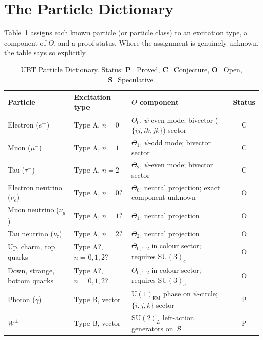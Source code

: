 \documentclass[12pt,a4paper]{article}
\theoremstyle{remark}
\newcommand{\B}{\mathcal{B}}
\begin{document}
\section{The Particle Dictionary}
\label{sec:dict}

Table~\ref{tab:dict} assigns each known particle (or particle class) to an
excitation type, a component of $\Theta$, and a proof status.  Where the
assignment is genuinely unknown, the table says so explicitly.

\begin{table}[htbp]
\centering
\caption{UBT Particle Dictionary. Status: \textbf{P}=Proved,
  \textbf{C}=Conjecture, \textbf{O}=Open, \textbf{S}=Speculative.}
\label{tab:dict}
\renewcommand{\arraystretch}{1.35}
\begin{tabular}{>{\raggedright}p{3.2cm}
                >{\raggedright}p{2.8cm}
                >{\raggedright}p{4.8cm}
                c}
\toprule
\textbf{Particle} & \textbf{Excitation type} & \textbf{$\Theta$ component} & \textbf{Status} \\
\midrule
Electron ($e^-$)
  & Type A, $n=0$
  & $\Theta_0$, $\psi$-even mode; bivector ($\{ij,ik,jk\}$) sector
  & C \\
Muon ($\mu^-$)
  & Type A, $n=1$
  & $\Theta_1$, $\psi$-odd mode; bivector sector
  & C \\
Tau ($\tau^-$)
  & Type A, $n=2$
  & $\Theta_2$, $\psi$-even mode; bivector sector
  & C \\
Electron neutrino ($\nu_e$)
  & Type A, $n=0$?
  & $\Theta_0$, neutral projection; exact component unknown
  & O \\
Muon neutrino ($\nu_\mu$)
  & Type A, $n=1$?
  & $\Theta_1$, neutral projection
  & O \\
Tau neutrino ($\nu_\tau$)
  & Type A, $n=2$?
  & $\Theta_2$, neutral projection
  & O \\
Up, charm, top quarks
  & Type A?, $n=0,1,2$?
  & $\Theta_{0,1,2}$ in colour sector; requires SU$(3)_c$
  & O \\
Down, strange, bottom quarks
  & Type A?, $n=0,1,2$?
  & $\Theta_{0,1,2}$ in colour sector; requires SU$(3)_c$
  & O \\
Photon ($\gamma$)
  & Type B, vector
  & U$(1)_{\mathrm{EM}}$ phase on $\psi$-circle; $\{i,j,k\}$ sector
  & P \\
$W^\pm$
  & Type B, vector
  & SU$(2)_L$ left-action generators on $\B$
  & P \\

\end{tabular}
\end{table}
\end{document}
